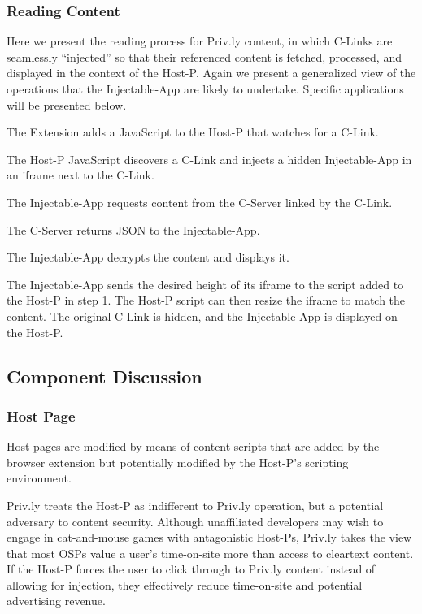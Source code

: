 \documentclass[letterpaper,twocolumn,10pt]{article}
\begin{document}
\subsubsection{Reading Content}

Here we present the reading process for Priv.ly 
content, in which C-Links are seamlessly ``injected'' so that their referenced 
content is fetched, processed, and displayed in the context of the Host-P.
Again we present a generalized view of the operations that the Injectable-App
are likely to undertake. Specific applications will be presented below.

\begin{compactenum}
  \item The Extension adds a JavaScript to the Host-P that watches for a C-Link.
  \item The Host-P JavaScript discovers a C-Link and 
  injects a hidden Injectable-App in an iframe next to the C-Link.
  \item The Injectable-App requests content from the C-Server linked by the 
  C-Link.
  \item The C-Server returns JSON to the Injectable-App.
  \item The Injectable-App decrypts the content and displays it.
  \item The Injectable-App sends the desired height of its iframe to the script 
  added to the Host-P in step 1. The Host-P script can then resize the iframe to 
  match the content. The original C-Link is hidden, and the Injectable-App is 
  displayed on the Host-P.
\end{compactenum}

\subsection{Component Discussion}

\subsubsection{Host Page} \label{sec:privly_content_script}

Host pages are modified by means of content scripts that are added by the browser
extension but potentially modified by the Host-P's scripting environment.

Priv.ly treats the Host-P as indifferent to Priv.ly operation, but a potential 
adversary to content security. Although unaffiliated developers may wish to engage 
in cat-and-mouse games with antagonistic Host-Ps, Priv.ly takes the view that most 
OSPs value a user's time-on-site more than access to cleartext content. If the 
Host-P forces the user to click through to Priv.ly content instead of allowing for injection, they effectively reduce 
time-on-site and potential advertising revenue.
\end{document}
